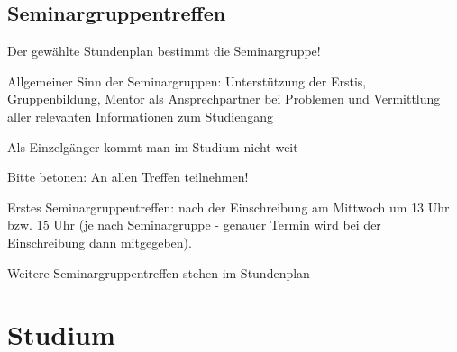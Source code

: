 \documentclass[a4paper,12pt]{report}
\begin{document}
\subsection{Seminargruppentreffen}
\begin{itemize*}
    \item Der gewählte Stundenplan bestimmt die Seminargruppe!
    \item Allgemeiner Sinn der Seminargruppen: Unterstützung der Erstis, Gruppenbildung, Mentor als Ansprechpartner bei Problemen und Vermittlung aller relevanten Informationen zum Studiengang
    \item \glqq Als Einzelgänger kommt man im Studium nicht weit\grqq
    \item Bitte betonen: An allen Treffen teilnehmen!
    \item Erstes Seminargruppentreffen: nach der Einschreibung am Mittwoch um 13 Uhr bzw. 15 Uhr (je nach Seminargruppe - genauer Termin wird bei der Einschreibung dann mitgegeben).
    \item Weitere Seminargruppentreffen stehen im Stundenplan
\end{itemize*}
\newpage
\section{Studium}
\end{document}
